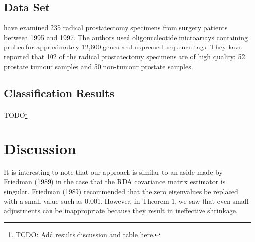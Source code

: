 \documentclass[11pt]{article}
\begin{document}
\subsection{\cite{Singh:2002fh} Data Set}

\cite{Singh:2002fh} have examined 235 radical prostatectomy specimens from surgery patients between 1995 and 1997. The authors used oligonucleotide microarrays containing probes for approximately 12,600 genes and expressed sequence tags. They have reported that 102 of the radical prostatectomy specimens are of high quality: 52 prostate tumour samples and 50 non-tumour prostate samples.

\subsection{Classification Results}

TODO\footnote{TODO: Add results discussion and table here.}


\section{Discussion}

It is interesting to note that our approach is similar to an aside made by Friedman (1989) in the case that the RDA covariance matrix estimator is singular. Friedman (1989) recommended that the zero eigenvalues be replaced with a small value such as 0.001. However, in Theorem 1, we saw that even small adjustments can be inappropriate because they result in ineffective shrinkage.
	



\end{document}
